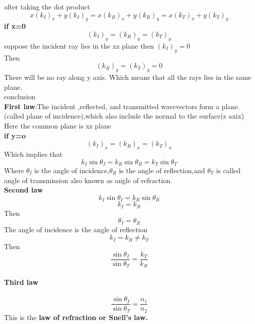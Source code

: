 after taking the dot product\\
$$x(k_I)_x+y(k_I)_y=x(k_R)_x+y(k_R)_y=x(k_T)_x+y(k_T)_y$$
\textbf{if x=0}
$$(k_I)_y=(k_R)_y=(k_T)_y$$
suppose the incident ray lies in the xz plane then $(k_I)_y=0$\\
Then$$(k_R)_y=(k_T)_y=0$$
There will be no ray along y axis.
Which means that all the rays lies in the same plane.\\
conclusion\\
\textbf{First law}:The incident ,reflected, and transmitted wavevectors form a plane.(called plane of incidence),which also include the normal to the surface(z axix)\\
Here the common plane is xz plane\\
\textbf{if y=o}\\
$$(k_I)_x=(k_R)_x=(k_T)_x$$
Which implies that 
$$k_I\sin \theta_I=k_R\sin\theta_R=k_T\sin \theta_T$$
Where $\theta_I$ is the angle of incidence,$\theta_R$ is the angle of reflection,and $\theta_T$ is called angle of transmission also known as angle of refraction.\\
\textbf{Second law}
$$k_I\sin \theta_I=k_R\sin\theta_R$$
$$k_I=k_R$$
Then $$\theta_I=\theta_R$$
The angle of incidence is the angle of reflection
$$k_I=k_R\neq k_T$$
Then  $$\frac{\sin \theta_I}{\sin \theta_T}=\frac{k_T}{k_R}$$
\paragraph{Third law}
$$\frac{\sin \theta_I}{\sin \theta_T}=\frac{n_1}{n_2}$$
This is the \textbf{law of refraction or Snell's law.}
